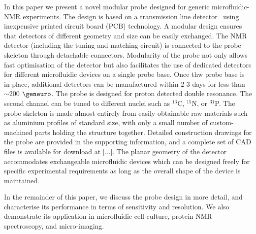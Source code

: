 \documentclass[preprint,12pt]{article}
\begin{document}
In this paper we present a novel modular probe designed for generic 
microfluidic-NMR experiments. The design is based on a transmission line 
detector~\cite{stripline_jan,gream_2016} using inexpensive 
printed circuit board (PCB) technology. A modular design ensures that detectors of 
different geometry and size can be easily exchanged. 
The NMR detector (including the tuning and matching circuit) is connected to the probe 
skeleton through detachable connectors. Modularity of the probe not only allows 
fast optimisation of the detector but also facilitates the use of dedicated detectors 
for different microfluidic devices on a single probe base. 
Once thw probe base is in place, additional detectors can be manufactured 
within 2-3 days for less than $\sim$200 $\geneuro$. 
The probe is designed for proton detected double resonance. 
The second channel can be tuned to different nuclei such as $^{13}$C, $^{15}$N, or 
$^{31}$P. The probe skeleton is made almost entirely from easily obtainable raw materials 
such as aluminium profiles of standard size, with only a small number of 
custom-machined parts holding the structure together. 
Detailed construction drawings for the probe are provided in the supporting 
information, and a complete set of CAD files is available for download at [...].
The planar geometry of the detector accommodates exchangeable microfluidic devices 
which can be designed freely for specific experimental requirements as long as the 
overall shape of the device is maintained. 

In the remainder of this paper, we discuss the probe design in more detail, 
and characterise its performance in terms of sensitivity and resolution. 
We also demonstrate its application in microfluidic cell culture, 
protein NMR spectroscopy, and micro-imaging. 
\end{document}
